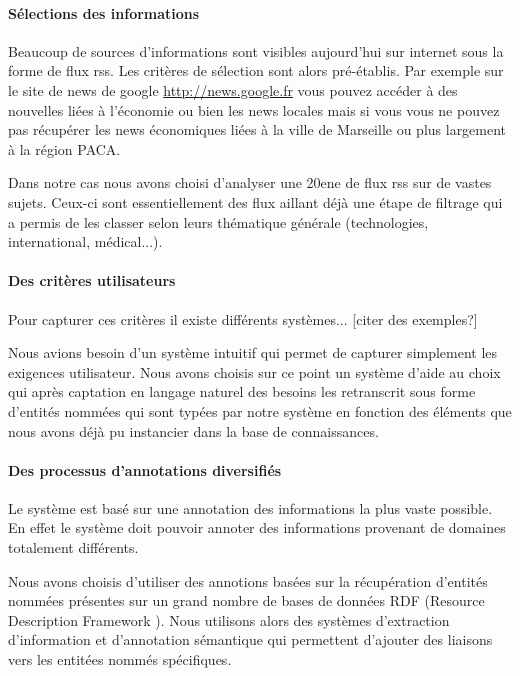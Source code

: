 \documentclass[]{easychair}
\begin{document}
\paragraph*{Sélections des informations}
Beaucoup de sources d'informations sont visibles aujourd'hui sur internet sous la forme de flux rss.  Les critères de sélection sont alors pré-établis.  Par exemple sur le site de news de google \url{http://news.google.fr} vous pouvez accéder à des nouvelles liées à l'économie ou bien les news locales mais si vous vous ne pouvez pas récupérer les news économiques liées à la ville de Marseille ou plus largement à la région PACA.

Dans notre cas nous avons choisi d'analyser une 20ene de flux rss sur de vastes sujets. Ceux-ci sont essentiellement des flux aillant déjà une étape de filtrage qui a permis de les classer selon leurs thématique générale (technologies, international, médical...).

\paragraph*{Des critères utilisateurs}

Pour capturer ces critères il existe différents systèmes... [citer des exemples?]

Nous avions besoin d'un système intuitif qui permet de capturer simplement les exigences utilisateur. Nous avons choisis sur ce point un système d'aide au choix qui après captation en langage naturel des besoins les retranscrit sous forme d'entités nommées qui sont typées par notre système en fonction des éléments que nous avons déjà pu instancier dans la base de connaissances.

\paragraph*{Des processus d'annotations diversifiés}
Le système est basé sur une annotation des informations la plus vaste possible. En effet le système doit pouvoir annoter des informations provenant de domaines totalement différents.

Nous avons choisis d'utiliser des annotions basées sur la récupération d'entités nommées présentes sur un grand nombre de bases de données RDF (Resource Description
Framework \cite{O. Lassila, R. Swick, Resource Description Framework (RDF) Model and Syntax Specification, W3C Recommendation 22 February 1999}).
Nous utilisons alors des systèmes d'extraction d'information et d'annotation sémantique qui permettent d'ajouter des liaisons vers les entitées nommés spécifiques.
\end{document}
